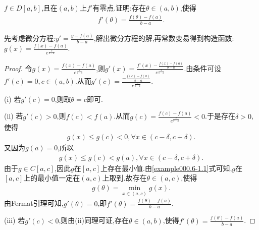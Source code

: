 \documentclass[../../main.tex]{subfiles}
\begin{document}
\begin{example}
$f\in D[a,b]$,且在$(a,b)$上$f'$有零点.证明:存在$\theta \in (a,b)$,使得
\begin{align*}
f'(\theta) = \frac{f(\theta) -f(a)}{b-a}.
\end{align*}
\end{example}
\begin{remark}
先考虑微分方程:$y' =\frac{y-f(a)}{b-a}$,解出微分方程的解,再常数变易得到构造函数:$g(x) =\frac{f(x) -f(a)}{e^{\frac{x}{b-a}}}$.
\end{remark}
\begin{proof}
令$g(x) =\frac{f(x) -f(a)}{e^{\frac{x}{b-a}}}$,则$g'(x) =\frac{f'(x) -\frac{f(x) -f(a)}{b-a}}{e^{\frac{x}{b-a}}}$.由条件可设$f'(c) =0,c\in (a,b)$.从而$g'(c) =\frac{-\frac{f(c) -f(a)}{b-a}}{e^{\frac{c}{b-a}}}$.

(i) 若$g'(c) =0$,则取$\theta =c$即可.

(ii) 若$g'(c) >0$,则$f(c) <f(a)$.从而$g(c) =\frac{f(c) -f(a)}{e^{\frac{c}{b-a}}}<0$.于是存在$\delta >0$,使得
\begin{align*}
g(x) \leqslant g(c) <0,\forall x\in (c-\delta ,c+\delta).
\end{align*}
又因为$g(a) =0$,所以
\begin{align}
g(x) \leqslant g(c) <g(a),\forall x\in (c-\delta ,c+\delta).\label{example000.6-1.1}
\end{align}
由于$g\in C[a,c]$,因此$g$在$[a,c]$上存在最小值.由\eqref{example000.6-1.1}式可知,$g$在$[a,c]$上的最小值一定在$(a,c)$上取到.故存在$\theta \in (a,c)$,使得
\begin{align*}
g(\theta) =\min_{x\in (a,c)}g(x).
\end{align*}
由Fermat引理可知,$g'(\theta) =0$,即$f'(\theta) =\frac{f(\theta) -f(a)}{b-a}$.

(iii) 若$g'(c) <0$,则由(ii)同理可证,存在$\theta \in (a,b)$,使得$f'(\theta) =\frac{f(\theta) -f(a)}{b-a}$.

\end{proof}
\end{document}
